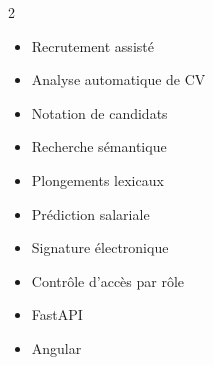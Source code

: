 \begin{multicols}{2}
\begin{itemize}[leftmargin=*,itemsep=4pt]
  \item Recrutement assisté
  \item Analyse automatique de CV
  \item Notation de candidats
  \item Recherche sémantique
  \item Plongements lexicaux
  \item Prédiction salariale
  \item Signature électronique
  \item Contrôle d'accès par rôle
  \item FastAPI
  \item Angular
\end{itemize}
\end{multicols}
